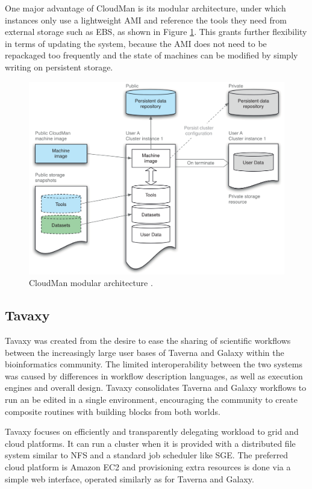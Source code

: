 \documentclass[11pt,a4paper]{report}
\begin{document}
One major advantage of CloudMan is its modular architecture, under which instances only use a lightweight AMI and reference the tools they need from external storage such as EBS, as shown in Figure \ref{CloudManArch}. This grants further flexibility in terms of updating the system, because the AMI does not need to be repackaged too frequently and the state of machines can be modified by simply writing on persistent storage.

\vspace{5mm}
\begin{figure}[h]
	\centering
		\includegraphics[scale=0.35]{figures/CloudManArch.png}
	\caption{CloudMan modular architecture \cite{Afgan2010}.}
	\label{CloudManArch}
\end{figure}

\subsection{Tavaxy}

Tavaxy \cite{Abouelhoda2012} was created from the desire to ease the sharing of scientific workflows between the increasingly large user bases of Taverna and Galaxy within the bioinformatics community. The limited interoperability between the two systems was caused by differences in workflow description languages, as well as execution engines and overall design. Tavaxy consolidates Taverna and Galaxy workflows to run an be edited in a single environment, encouraging the community to create composite routines with building blocks from both worlds.

Tavaxy focuses on efficiently and transparently delegating workload to grid and cloud platforms. It can run a cluster when it is provided with a distributed file system similar to NFS and a standard job scheduler like SGE. The preferred cloud platform is Amazon EC2 and provisioning extra resources is done via a simple web interface, operated similarly as for Taverna and Galaxy.
\end{document}
